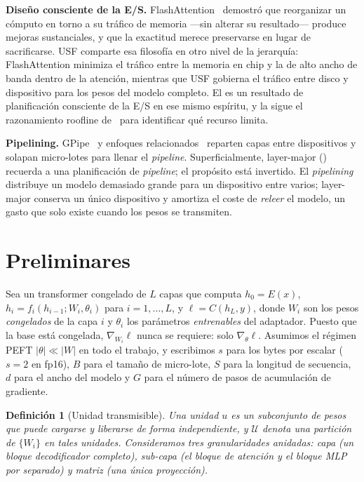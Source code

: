 \documentclass[journal]{IEEEtran}
\newtheorem{definition}[theorem]{Definición}
\newcommand{\usf}{USF}
\begin{document}
\textbf{Diseño consciente de la E/S.} FlashAttention~\cite{dao2022flashattention} demostró que
reorganizar un cómputo en torno a su tráfico de memoria ---sin alterar su resultado--- produce
mejoras sustanciales, y que la exactitud merece preservarse en lugar de sacrificarse. \usf{}
comparte esa filosofía en otro nivel de la jerarquía: FlashAttention minimiza el tráfico entre la
memoria en chip y la de alto ancho de banda dentro de la atención, mientras que \usf{} gobierna el
tráfico entre disco y dispositivo para los pesos del modelo completo. El  es un
resultado de planificación consciente de la E/S en ese mismo espíritu, y la  sigue
el razonamiento roofline de~\cite{williams2009roofline} para identificar qué recurso limita.

\textbf{Pipelining.} GPipe~\cite{huang2019gpipe} y enfoques
relacionados~\cite{jia2019beyond} reparten capas entre dispositivos y solapan micro-lotes para
llenar el \emph{pipeline}. Superficialmente, layer-major () recuerda a una
planificación de \emph{pipeline}; el propósito está invertido. El \emph{pipelining} distribuye un
modelo demasiado grande para un dispositivo entre varios; layer-major conserva un único dispositivo
y amortiza el coste de \emph{releer} el modelo, un gasto que solo existe cuando los pesos se
transmiten.

\section{Preliminares}
\label{sec:prelim}

Sea un transformer congelado de $L$ capas que computa $h_0 = E(x)$,
$h_i = f_i(h_{i-1}; W_i, \theta_i)$ para $i=1,\dots,L$, y $\ell = C(h_L,y)$, donde $W_i$ son los
pesos \emph{congelados} de la capa $i$ y $\theta_i$ los parámetros \emph{entrenables} del
adaptador. Puesto que la base está congelada, $\nabla_{W_i}\ell$ nunca se requiere: solo
$\nabla_{\theta}\ell$. Asumimos el régimen PEFT $|\theta| \ll |W|$ en todo el trabajo, y
escribimos $s$ para los bytes por escalar ($s=2$ en fp16), $B$ para el tamaño de micro-lote, $S$
para la longitud de secuencia, $d$ para el ancho del modelo y $G$ para el número de pasos de
acumulación de gradiente.

\begin{definition}[Unidad transmisible]
\label{def:unit}
Una \emph{unidad} $u$ es un subconjunto de pesos que puede cargarse y liberarse de forma
independiente, y $\mathcal{U}$ denota una partición de $\{W_i\}$ en tales unidades. Consideramos
tres granularidades anidadas: \emph{capa} (un bloque decodificador completo), \emph{sub-capa} (el
bloque de atención y el bloque MLP por separado) y \emph{matriz} (una única proyección).
\end{definition}
\end{document}

